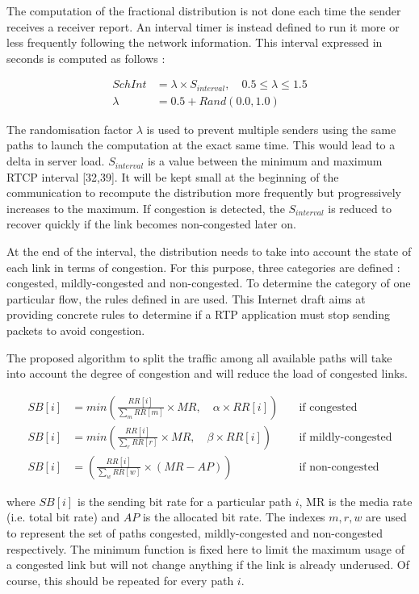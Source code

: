 The computation of the fractional distribution is not done each time the sender receives a receiver report. An interval timer is instead defined to run it more or less frequently following the network information. This interval expressed in seconds is computed as follows : 

\begin{equation*}
\begin{split}
SchInt & = \lambda \times S_{interval},\quad 0.5 \le \lambda \le 1.5 \\
 \lambda & = 0.5 + Rand(0.0,1.0)
\end{split}
\end{equation*}

The randomisation factor $\lambda$ is used to prevent multiple senders using the same paths to launch the computation at the exact same time. This would lead to a delta in server load. $S_{interval}$ is a value between the minimum and maximum RTCP interval [32,39]. It will be kept small at the beginning of the communication to recompute the distribution more frequently but progressively increases to the maximum. If congestion is detected, the $S_{interval}$ is reduced to recover quickly if the link becomes non-congested later on.

At the end of the interval, the distribution needs to take into account the state of each link in terms of congestion. For this purpose, three categories are defined : congested, mildly-congested and non-congested. To determine the category of one particular flow, the rules defined in \cite{ietf-avtcore-rtp-circuit-breakers} are used. This Internet draft aims at providing concrete rules to determine if a RTP application must stop sending packets to avoid congestion.

The proposed algorithm to split the traffic among all available paths will take into account the degree of congestion and will reduce the load of congested links.

\begin{align*}
SB[i] & = min\left( \frac{RR[i]}{\sum_{m} RR[m]} \times MR,\quad \alpha \times RR[i] \right) &\quad \text{if congested} \\
SB[i] & = min\left( \frac{RR[i]}{\sum_{r} RR[r]} \times MR,\quad \beta \times RR[i] \right) &\quad \text{if mildly-congested} \\
SB[i] & = \left( \frac{RR[i]}{\sum_{w} RR[w]} \times (MR - AP) \right) & \quad \text{if non-congested}
\end{align*}

where $SB[i]$ is the sending bit rate for a particular path $i$, MR is the media rate (i.e. total bit rate) and $AP$ is the allocated bit rate. The indexes $m,r,w$ are used to represent the set of paths congested, mildly-congested and non-congested respectively. The minimum function is fixed here to limit the maximum usage of a congested link but will not change anything if the link is already underused. Of course, this should be repeated for every path $i$.

